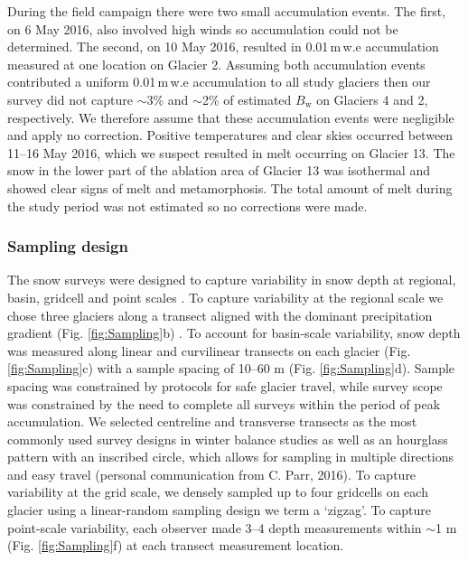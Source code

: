 \documentclass[twocolumn, letterpaper]{igs}
\begin{document}
During the field campaign there were two small accumulation events. The first, on 6 May 2016, also involved high winds so accumulation could not be determined. The second, on 10 May 2016, resulted in 0.01\,m\,w.e accumulation measured at one location on Glacier 2. Assuming both accumulation events contributed a uniform 0.01\,m\,w.e accumulation to all study glaciers then our survey did not capture $\sim$3\% and $\sim$2\% of estimated $B_\mathrm{w}$ on Glaciers 4 and 2, respectively. We therefore assume that these accumulation events were negligible and apply no correction. Positive temperatures and clear skies occurred between 11--16 May 2016, which we suspect resulted in melt occurring on Glacier 13. The snow in the lower part of the ablation area of Glacier 13 was isothermal and showed clear signs of melt and metamorphosis. The total amount of melt during the study period was not estimated so no corrections were made. 

\subsubsection{Sampling design}

The snow surveys were designed to capture variability in snow depth at regional, basin, gridcell and point scales \citep{Clark2011}. To capture variability at the regional scale we chose three glaciers along a transect aligned with the dominant precipitation gradient  (Fig. \ref{fig:Sampling}b) \citep{Taylor1969}. To account for basin-scale variability, snow depth was measured along linear and curvilinear transects on each glacier (Fig. \ref{fig:Sampling}c) with a sample spacing of 10--60 m (Fig. \ref{fig:Sampling}d). Sample spacing was constrained by protocols for safe glacier travel, while survey scope was constrained by the need to complete all surveys within the period of peak accumulation. We selected centreline and transverse transects as the most commonly used survey designs in winter balance studies \citep[e.g.][]{Kaser2003, Machguth2006} as well as an hourglass pattern with an inscribed circle, which allows for sampling in multiple directions and easy travel (personal communication from C. Parr, 2016). To capture variability at the grid scale, we densely sampled up to four gridcells on each glacier using a linear-random sampling design \citep{Shea2010} we term a `zigzag'. To capture point-scale variability, each observer made 3--4 depth measurements within $\sim$1 m (Fig. \ref{fig:Sampling}f) at each transect measurement location. 
\end{document}
